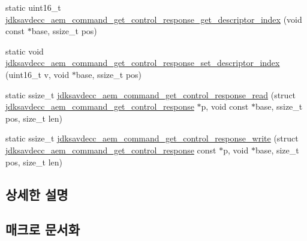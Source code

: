 \begin{DoxyCompactItemize}
\item 
static uint16\+\_\+t \hyperlink{group__command__get__control__response_ga7d564a31c9f9ba8d81b13d2f4e3c09e9}{jdksavdecc\+\_\+aem\+\_\+command\+\_\+get\+\_\+control\+\_\+response\+\_\+get\+\_\+descriptor\+\_\+index} (void const $\ast$base, ssize\+\_\+t pos)
\item 
static void \hyperlink{group__command__get__control__response_gaf04100f5820b42b02b7307e7f630468f}{jdksavdecc\+\_\+aem\+\_\+command\+\_\+get\+\_\+control\+\_\+response\+\_\+set\+\_\+descriptor\+\_\+index} (uint16\+\_\+t v, void $\ast$base, ssize\+\_\+t pos)
\item 
static ssize\+\_\+t \hyperlink{group__command__get__control__response_gaaf7dbfb237d8e2d2ff4f375eec07e279}{jdksavdecc\+\_\+aem\+\_\+command\+\_\+get\+\_\+control\+\_\+response\+\_\+read} (struct \hyperlink{structjdksavdecc__aem__command__get__control__response}{jdksavdecc\+\_\+aem\+\_\+command\+\_\+get\+\_\+control\+\_\+response} $\ast$p, void const $\ast$base, ssize\+\_\+t pos, size\+\_\+t len)
\item 
static ssize\+\_\+t \hyperlink{group__command__get__control__response_ga9d4e52e817b8e8b77ab1ccdbd5fe5102}{jdksavdecc\+\_\+aem\+\_\+command\+\_\+get\+\_\+control\+\_\+response\+\_\+write} (struct \hyperlink{structjdksavdecc__aem__command__get__control__response}{jdksavdecc\+\_\+aem\+\_\+command\+\_\+get\+\_\+control\+\_\+response} const $\ast$p, void $\ast$base, size\+\_\+t pos, size\+\_\+t len)
\end{DoxyCompactItemize}


\subsection{상세한 설명}


\subsection{매크로 문서화}
